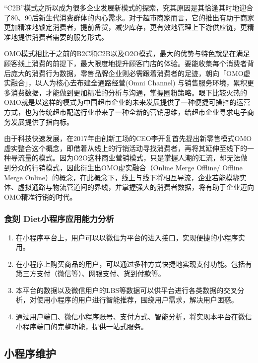 \documentclass[UTF8,12pt]{ctexart}
\numberwithin{figure}{section}%
\begin{document}
\begin{spacing}{2}
“C2B”模式之所以成为很多企业发展新模式的探索，究其原因是其恰逢其时地迎合了80、90后新生代消费群体的内心需求。对于超市商家而言，它的推出有助于商家更加精准地锁定消费者，提前备货，减少库存，更有效地管理上下游供应链，更精准地提供消费者需要的服务形式。

OMO模式相比于之前的B2C和C2B以及O2O模式，最大的优势与特色就是在满足顾客线上消费的前提下，最大限度地提升顾客门店的体验。要能收集每个消费者背后庞大的消费行为数据，零售品牌企业则必需跟着消费者的足迹，朝向「OMO虚实融合」，以人为核心去布建全通路经营(Omni Channel) 与销售服务环境，累积更多消费数据，才能做到更加精准的分析与沟通，掌握圈粉策略。眼下比较火热的OMO就是以这样的模式为中国超市企业的未来发展提供了一种便捷可操控的运营方式，也为传统超市配送行业带来了一种全新的营销思维，给超市企业寻求电子商务发展提供了指向标。

由于科技快速发展，在2017年由创新工场的CEO李开复首先提出新零售模式OMO虚实整合这个概念，即借着从线上的行销活动寻找消费者，再将其延伸至线下的一种导流量的模式。因为O2O这种商业营销模式，只是掌握人潮的汇流，却无法做到分众的行销模式，因此衍生出OMO虚实融合（Online Merge Offline/ Offline Merge Online）的概念，在此概念下，线上与线下将相互导流，企业若能模糊实体、虚拟通路与物流管道间的界线，并掌握强大的消费者数据，将有助于企业迈向OMO精准行销的时代。

\subsubsection{食刻 Diet小程序应用能力分析}
\begin{enumerate}
	\item[(1)]在小程序平台上，用户可以以微信为平台的进入接口，实现便捷的小程序实用。
	
	\item[(2)]在小程序上购买商品的用户，可以通过多种方式快捷地实现支付功能。包括有第三方支付（微信等）、网银支付、货到付款等。	
	
	\item[(3)]本平台的数据以及微信用户的LBS等数据可以供平台进行各类数据的交叉分析，对使用小程序的用户进行智能推荐，围绕用户需求，解决用户困惑。
	
	\item[(4)]通过用户端口、微信小程序账号、支付方式、智能分析，将实现本平台在微信小程序端口的完整功能，提供一站式服务。
	
\end{enumerate}

\subsection{小程序维护}


\end{spacing}
\end{document}
